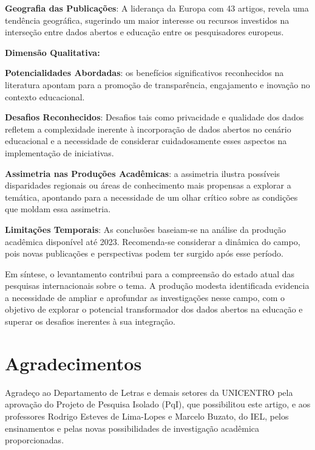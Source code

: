 \documentclass[portuguese]{textolivre}
\begin{document}
\textbf{Geografia das Publicações}: A liderança da Europa com 43 artigos, revela uma tendência geográfica, sugerindo um maior interesse ou recursos investidos na interseção entre dados abertos e educação entre os pesquisadores europeus.

\textbf{Dimensão Qualitativa:}

\textbf{Potencialidades Abordadas}: os benefícios significativos reconhecidos na literatura apontam para a promoção de transparência, engajamento e inovação no contexto educacional. 

\textbf{Desafios Reconhecidos}: Desafios tais como privacidade e qualidade dos dados refletem a complexidade inerente à incorporação de dados abertos no cenário educacional e a necessidade de considerar cuidadosamente esses aspectos na implementação de iniciativas.

\textbf{Assimetria nas Produções Acadêmicas}: a assimetria ilustra possíveis disparidades regionais ou áreas de conhecimento mais propensas a explorar a temática, apontando para a necessidade de um olhar crítico sobre as condições que moldam essa assimetria.

\textbf{Limitações Temporais}: As conclusões baseiam-se na análise da produção acadêmica disponível até 2023. Recomenda-se considerar a dinâmica do campo, pois novas publicações e perspectivas podem ter surgido após esse período.

Em síntese, o levantamento contribui para a compreensão do estado atual das pesquisas internacionais sobre o tema. A produção modesta identificada evidencia a necessidade de ampliar e aprofundar as investigações nesse campo, com o objetivo de explorar o potencial transformador dos dados abertos na educação e superar os desafios inerentes à sua integração.

\section{Agradecimentos}\label{sec-idioma}
Agradeço ao Departamento de Letras e demais setores da UNICENTRO pela aprovação do Projeto de Pesquisa Isolado (PqI), que possibilitou este artigo, e aos professores Rodrigo Esteves de Lima-Lopes e Marcelo Buzato, do IEL, pelos ensinamentos e pelas novas possibilidades de investigação acadêmica proporcionadas.


\printbibliography\label{sec-bib}
\end{document}
